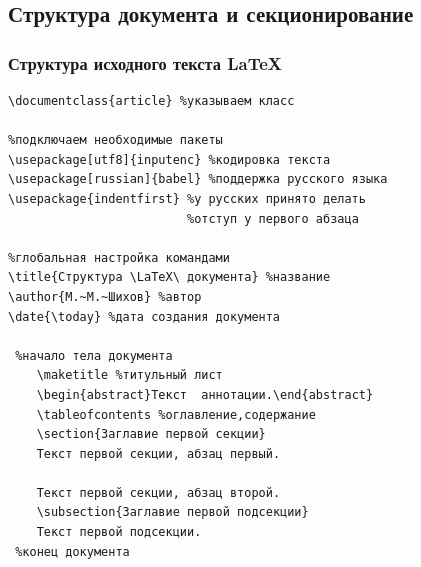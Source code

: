 \subsection{Структура документа и секционирование}

\begin{frame}
\frametitle{Структура исходного текста \LaTeX}
\begin{verbatim}
\documentclass{article} %указываем класс

%подключаем необходимые пакеты
\usepackage[utf8]{inputenc} %кодировка текста
\usepackage[russian]{babel} %поддержка русского языка
\usepackage{indentfirst} %у русских принято делать 
                         %отступ у первого абзаца

%глобальная настройка командами
\title{Структура \LaTeX\ документа} %название
\author{М.~М.~Шихов} %автор
\date{\today} %дата создания документа

 %начало тела документа
    \maketitle %титульный лист
    \begin{abstract}Текст  аннотации.\end{abstract}
    \tableofcontents %оглавление,содержание
    \section{Заглавие первой секции}
    Текст первой секции, абзац первый.

    Текст первой секции, абзац второй.
    \subsection{Заглавие первой подсекции}
    Текст первой подсекции.
 %конец документа
\end{verbatim}
\end{frame}


